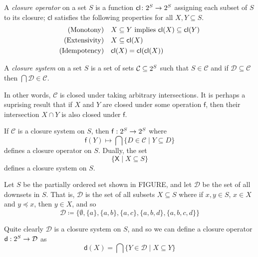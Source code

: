 \begin{definition}
\label{definition:closure-operator}
	A \emph{closure operator} on a set $S$ is a function $\mathsf{cl} \colon 2^{S} \to 2^{S}$ assigning each subset of $S$ to its closure; $\mathsf{cl}$ satisfies the following properties for all $X,Y \subseteq S$.
	\vspace{-1em}
	\begin{align}
    \text{(Monotony)} \quad & X \subseteq Y \text{ implies } \mathsf{cl}(X) \subseteq \mathsf{cl} (Y) \\
    \text{(Extensivity)} \quad & X \subseteq \mathsf{cl} (X) \\
    \text{(Idempotency)} \quad & \mathsf{cl} (X) = \mathsf{cl}(\mathsf{cl}(X))
    \vspace{-1em}
  \end{align}
\end{definition}

\begin{definition}
\label{definition:closure-system}
A \emph{closure system} on a set $S$ is a set of sets $\mathcal{C} \subseteq 2^{S}$ such that $S \in \mathcal{C}$ and if $\mathcal{D} \subseteq \mathcal{C}$ then $\bigcap \mathcal{D} \in \mathcal{C}$.
\end{definition}

In other words, $\mathcal{C}$ is closed under taking arbitrary intersections. It is perhaps a suprising result that if $X$ and $Y$ are closed under some operation $\mathsf{f}$, then their intersection $X \cap Y$ is also closed under $\mathsf{f}$.

\begin{theorem}
\label{theorem:relation-closure-operator-systems}
	If $\mathcal{C}$ is a closure system on $S$, then $\mathsf{f} : 2^{S} \to 2^{S}$
	where \[\mathsf{f}(Y) \mapsto \bigcap \{D \in \mathcal{C} \mid Y \subseteq D\}\] defines a closure operator on $S$. Dually, the set
	\[\{\mathsf{X} \mid X \subseteq S\}\]
	defines a closure system on $S$.
\end{theorem}


\begin{example}
Let $S$ be the partially ordered set shown in FIGURE, and let $\mathcal{D}$ be the set of all downsets in $S$. That is, $\mathcal{D}$ is the set of all subsets $X \subseteq S$ where if $x,y \in S$, $x \in X$ and $y \preceq x$, then $y \in X$, and so
\[\mathcal{D} \coloneq \{\emptyset, \{a\}, \{a,b\}, \{a,c\}, \{a,b,d\}, \{a,b,c,d\}\} \]

Quite clearly $\mathcal{D}$ is a closure system on $S$, and so we can define a closure operator $\mathsf{d}: 2^{S} \to \mathcal{D}$ as \[\mathsf{d}(X) = \bigcap \{Y \in \mathcal{D} \mid X \subseteq Y\}\]
\end{example}

